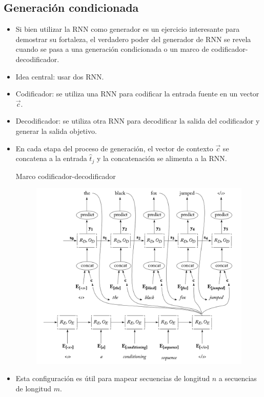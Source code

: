 \subsection{Generación condicionada}
\begin{itemize}
\item Si bien utilizar la RNN como generador es un ejercicio interesante para demostrar su fortaleza, el verdadero poder del generador de RNN se revela cuando se pasa a una generación condicionada o un marco de codificador-decodificador.
\item Idea central: usar dos RNN.
\item Codificador: se utiliza una RNN para codificar la entrada fuente en un vector $\overrightarrow{c}$.
\item Decodificador: se utiliza otra RNN para decodificar la salida del codificador y generar la salida objetivo.
\item En cada etapa del proceso de generación, el vector de contexto $\overrightarrow{c}$ se concatena a la entrada $\hat{t}_j$ y la concatenación se alimenta a la RNN.
\begin{frame}{Marco codificador-decodificador}
         \begin{figure}[h]
        	\includegraphics[scale = 0.32]{pics/seqseq.png}
        \end{figure}
\end{frame}
\item Esta configuración es útil para mapear secuencias de longitud $n$ a secuencias de longitud $m$.

\end{itemize}
